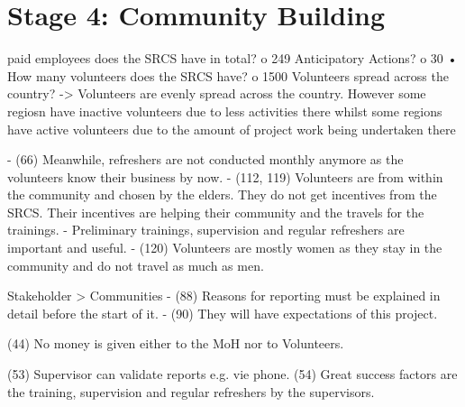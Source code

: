 


\section{Stage 4: Community Building} %


paid employees does the SRCS have in total?
o	249
Anticipatory Actions?
o	30
•	How many volunteers does the SRCS have?
o	1500
Volunteers spread across the country? 
-> Volunteers are evenly spread across the country.
However some regiosn have inactive volunteers due to less activities there whilst some regions have active volunteers due to the amount of project work being undertaken there










-	(66) Meanwhile, refreshers are not conducted monthly anymore as the volunteers know their business by now. 
-	(112, 119) Volunteers are from within the community and chosen by the elders. They do not get incentives from the SRCS. Their incentives are helping their community and the travels for the trainings.
-	Preliminary trainings, supervision and regular refreshers are important and useful.
-	(120) Volunteers are mostly women as they stay in the community and do not travel as much as men.

Stakeholder > Communities
-	(88) Reasons for reporting must be explained in detail before the start of it.
-	(90) They will have expectations of this project.

(44) No money is given either to the MoH nor to Volunteers.

(53) Supervisor can validate reports e.g. vie phone.
(54) Great success factors are the training, supervision and regular refreshers by the supervisors.


